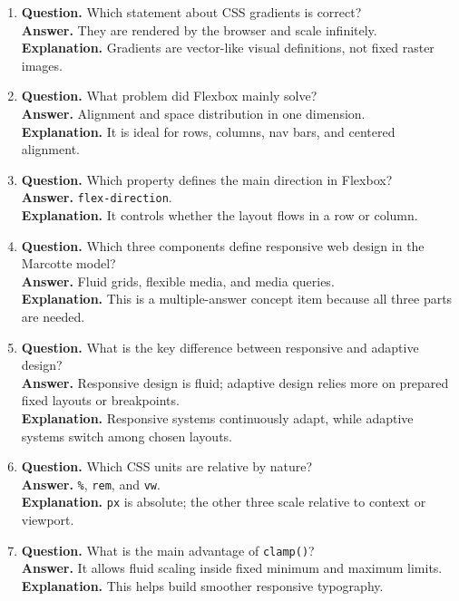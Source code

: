 \documentclass[11pt,a4paper]{article}
\begin{document}
\begin{enumerate}
  \item \textbf{Question.} Which statement about CSS gradients is correct?\\
  \textbf{Answer.} They are rendered by the browser and scale infinitely.\\
  \textbf{Explanation.} Gradients are vector-like visual definitions, not fixed raster images.

  \item \textbf{Question.} What problem did Flexbox mainly solve?\\
  \textbf{Answer.} Alignment and space distribution in one dimension.\\
  \textbf{Explanation.} It is ideal for rows, columns, nav bars, and centered alignment.

  \item \textbf{Question.} Which property defines the main direction in Flexbox?\\
  \textbf{Answer.} \texttt{flex-direction}.\\
  \textbf{Explanation.} It controls whether the layout flows in a row or column.

  \item \textbf{Question.} Which three components define responsive web design in the Marcotte model?\\
  \textbf{Answer.} Fluid grids, flexible media, and media queries.\\
  \textbf{Explanation.} This is a multiple-answer concept item because all three parts are needed.

  \item \textbf{Question.} What is the key difference between responsive and adaptive design?\\
  \textbf{Answer.} Responsive design is fluid; adaptive design relies more on prepared fixed layouts or breakpoints.\\
  \textbf{Explanation.} Responsive systems continuously adapt, while adaptive systems switch among chosen layouts.

  \item \textbf{Question.} Which CSS units are relative by nature?\\
  \textbf{Answer.} \texttt{\%}, \texttt{rem}, and \texttt{vw}.\\
  \textbf{Explanation.} \texttt{px} is absolute; the other three scale relative to context or viewport.

  \item \textbf{Question.} What is the main advantage of \texttt{clamp()}?\\
  \textbf{Answer.} It allows fluid scaling inside fixed minimum and maximum limits.\\
  \textbf{Explanation.} This helps build smoother responsive typography.


\end{enumerate}
\end{document}
